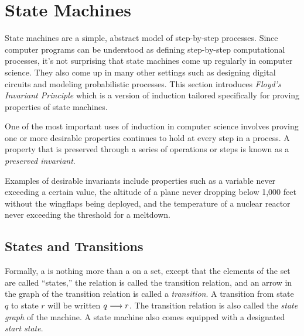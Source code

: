 \chapter{State Machines}\label{state_machine_chap}

State machines are a simple, abstract model of step-by-step processes.
Since computer programs can be understood as defining step-by-step
computational processes, it's not surprising that state machines come
up regularly in computer science.  They also come up in many other
settings such as designing digital circuits and modeling probabilistic
processes.  This section introduces \emph{Floyd's Invariant Principle}
which is a version of induction tailored specifically for proving
properties of state machines.

\iffalse
You may already have seen them in a digital logic course,
a compiler course, or a probability course.
\fi

One of the most important uses of induction in computer science
involves proving one or more desirable properties continues to hold at
every step in a process.  A property that is preserved through a
series of operations or steps is known as a \emph{preserved
  invariant}.

Examples of desirable invariants include properties such as a variable
never exceeding a certain value, the altitude of a plane never
dropping below 1,000 feet without the wingflaps \iffalse and landing
gear\fi being deployed, and the temperature of a nuclear reactor never
exceeding the threshold for a meltdown.

\iffalse  %
In particular, we show that the proposition is true at the beginning
(this is the base case) and that if it is true after $t$ steps have
been taken, it will also be true after step~$t + 1$ (this is the
inductive step).  We can then use the induction principle to conclude
that the proposition is indeed an invariant, namely, that it will
always hold.
\fi

\section{States and Transitions}

Formally, a  is nothing more than a  on a set, except that the elements of the set are called
``states,'' the relation is called the transition relation, and an
arrow in the graph of the transition relation is called a
\emph{transition}.  A transition from state $q$ to state $r$ will be
written $q \mathrel{\longrightarrow} r$.  The transition relation is also called the
\emph{state graph} of the machine.  A state machine also comes
equipped with a designated \emph{start state}.

